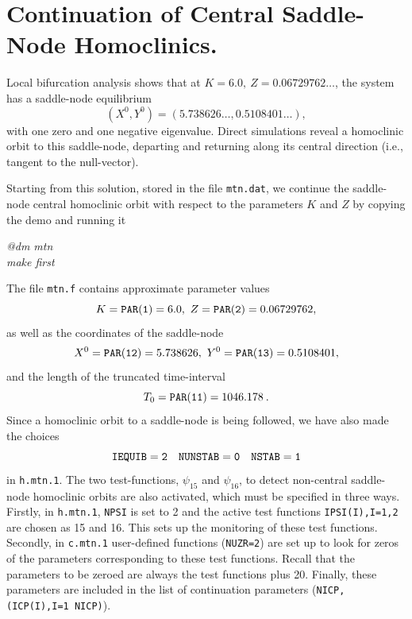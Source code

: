 \documentclass[12pt]{report}
\begin{document}
\section{Continuation of Central Saddle-Node Homoclinics.}
Local bifurcation analysis shows that at $K=6.0,\ Z=0.06729762\ldots$,
the system has a saddle-node equilibrium 
$$
(X^0,Y^0) = (5.738626\ldots,0.5108401\ldots),
$$
with one zero and one negative eigenvalue. Direct simulations reveal a
homoclinic 
orbit to this saddle-node, departing and returning along its central
direction (i.e., tangent to the null-vector).
\par
Starting from this solution, stored in the file {\tt mtn.dat}, we
continue the saddle-node central homoclinic orbit 
with respect to the parameters $K$ and $Z$ by copying the
demo and running it
\begin{center}
{\it @dm mtn}\\
{\it make first}
\end{center}
The file {\tt mtn.f} contains approximate
parameter values
$$
K={\tt PAR(1)}=6.0,\ Z={\tt PAR(2)}=0.06729762,
$$
as well as the coordinates of the saddle-node
$$
X^0={\tt PAR(12)}=5.738626,\ Y^0={\tt PAR(13)}=0.5108401,
$$
and the length of the truncated time-interval
$$
T_0={\tt PAR(11)} = 1046.178 \: .
$$
Since a homoclinic orbit to a saddle-node is being followed, we have also
made the choices
$$
{\tt IEQUIB = 2 \quad NUNSTAB =0 \quad NSTAB = 1   }
$$
in {\tt h.mtn.1}. The two test-functions, $\psi_{15}$ and $\psi_{16}$, 
to detect non-central saddle-node homoclinic
orbits are also activated, which must be specified in three ways. 
Firstly, in {\tt h.mtn.1}, {\tt NPSI} is
set to 2 and the active test functions {\tt IPSI(I),I=1,2}
are chosen as 15 and 16. This sets up the monitoring of these
test functions. Secondly, in {\tt c.mtn.1} user-defined functions
({\tt NUZR=2}) are set up to look for zeros of the parameters
corresponding to these test functions. Recall that the
parameters to be zeroed are always the test functions plus 20.
Finally, these parameters are included in the list of continuation
parameters ({\tt NICP,(ICP(I),I=1 NICP)}).
\end{document}
